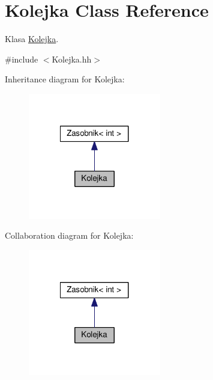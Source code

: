 \hypertarget{a00011}{}\section{Kolejka Class Reference}
\label{a00011}


Klasa \hyperlink{a00011}{Kolejka}.  




{\ttfamily \#include $<$Kolejka.\+hh$>$}



Inheritance diagram for Kolejka\+:
\nopagebreak
\begin{figure}[H]
\begin{center}
\leavevmode
\includegraphics[width=164pt]{a00131}
\end{center}
\end{figure}


Collaboration diagram for Kolejka\+:
\nopagebreak
\begin{figure}[H]
\begin{center}
\leavevmode
\includegraphics[width=164pt]{a00132}
\end{center}
\end{figure}
